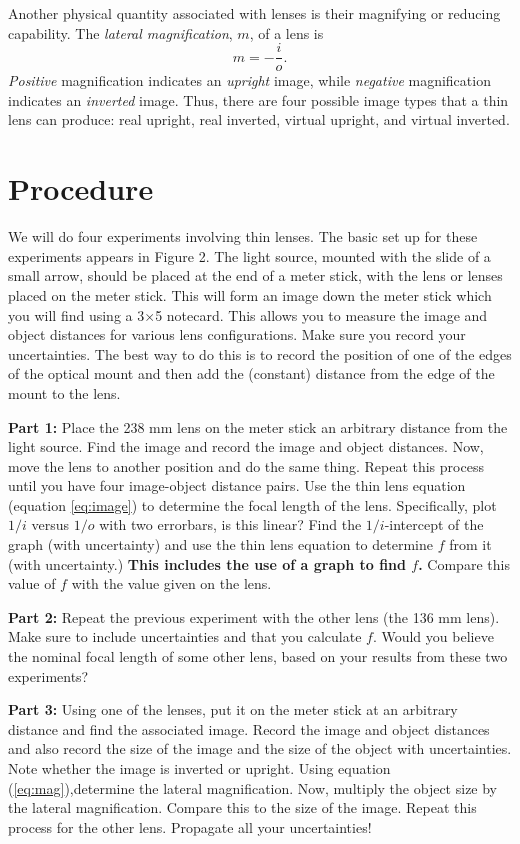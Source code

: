 Another physical quantity associated with lenses is their magnifying or
reducing capability. The {\em lateral magnification}, $m$, of a lens is 
\begin{equation}
m = - \frac{i}{o}. \label{eq:mag}
\end{equation}
{\em Positive} magnification indicates an {\em upright} image, while
{\em negative} magnification indicates an {\em inverted} image. Thus, there
are four possible image types that a thin lens can produce: real upright,
real inverted, virtual upright, and virtual inverted.

\section{Procedure}

We will do four experiments involving thin lenses. The basic set up for
these experiments appears in Figure 2. The light source, mounted with the 
slide of a small arrow, should be placed at the end of a meter stick, with 
the lens or lenses placed on the meter stick. This will form an image down 
the meter stick which you will find using a 3$\times$5 notecard. This 
allows you to measure the image and object distances for various lens 
configurations. Make sure you record your uncertainties.  The best way to do 
this is to record the position of one of the edges of the optical mount and 
then add the (constant) distance from the edge of the mount to the lens.

{\bf Part 1:} Place the 238 mm lens on the meter stick an arbitrary
distance from the light source. Find the image and record the image  and
object distances. Now, move the lens  to another position and do the same
thing. Repeat this process until you have four image-object distance pairs.
Use the thin lens equation (equation \ref{eq:image}) to determine the focal
length of the lens. Specifically, plot $1/i$ versus $1/o$ with two errorbars,
is this linear? Find the $1/i$-intercept of the graph (with uncertainty) and 
use the thin lens equation to determine $f$ from it (with uncertainty.) 
{\bf This includes the use of a graph to find $f$.}
Compare this value of $f$ with the value given on the lens.

{\bf Part 2:} Repeat the previous experiment with the other lens (the 
136 mm lens). Make sure to include uncertainties and that you calculate $f$. 
Would you believe the nominal focal length of some other lens, based on your 
results from these two experiments?

{\bf Part 3:} Using one of the lenses, put it on the meter stick at an 
arbitrary distance and find the associated image. Record the image and 
object distances and also record the size of the image and the size of the 
object with uncertainties. Note whether the image is inverted or upright. 
Using equation (\ref{eq:mag}),determine the lateral magnification. Now, 
multiply the object size by the lateral magnification. Compare this to the 
size of the image. Repeat this process for the other lens. Propagate all your 
uncertainties!

